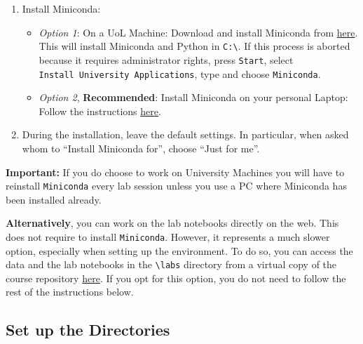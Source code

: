 \documentclass[
  letterpaper,
  DIV=11,
  numbers=noendperiod]{scrreprt}
\providecommand{\tightlist}{%
  \setlength{\itemsep}{0pt}\setlength{\parskip}{0pt}}\usepackage{longtable,booktabs,array}
\begin{document}
\begin{enumerate}
\def\labelenumi{\arabic{enumi}.}
\tightlist
\item
  Install Miniconda:

  \begin{itemize}
  \tightlist
  \item
    \emph{Option 1}: On a UoL Machine: Download and install Miniconda
    from
    \href{https://repo.anaconda.com/miniconda/Miniconda3-latest-Windows-x86_64.exe}{here}.
    This will install Miniconda and Python in
    \texttt{C:\textbackslash{}}. If this process is aborted because it
    requires administrator rights, press \texttt{Start}, select
    \texttt{Install\ University\ Applications}, type and choose
    \texttt{Miniconda}.
  \item
    \emph{Option 2}, \textbf{Recommended}: Install Miniconda on your
    personal Laptop: Follow the instructions
    \href{https://docs.conda.io/projects/miniconda/en/latest/miniconda-install.html}{here}.
  \end{itemize}
\item
  During the installation, leave the default settings. In particular,
  when asked whom to ``Install Miniconda for'', choose ``Just for me''.
\end{enumerate}

\textbf{Important:} If you do choose to work on University Machines you
will have to reinstall \texttt{Miniconda} every lab session unless you
use a PC where Miniconda has been installed already.

\textbf{Alternatively}, you can work on the lab notebooks directly on
the web. This does not require to install \texttt{Miniconda}. However,
it represents a much slower option, especially when setting up the
environment. To do so, you can access the data and the lab notebooks in
the \texttt{\textbackslash{}labs} directory from a virtual copy of the
course repository
\href{https://mybinder.org/v2/gh/GDSL-UL/wma/HEAD}{here}. If you opt for
this option, you do not need to follow the rest of the instructions
below.

\hypertarget{set-up-the-directories}{%
\subsection*{Set up the Directories}\label{set-up-the-directories}}
\end{document}
